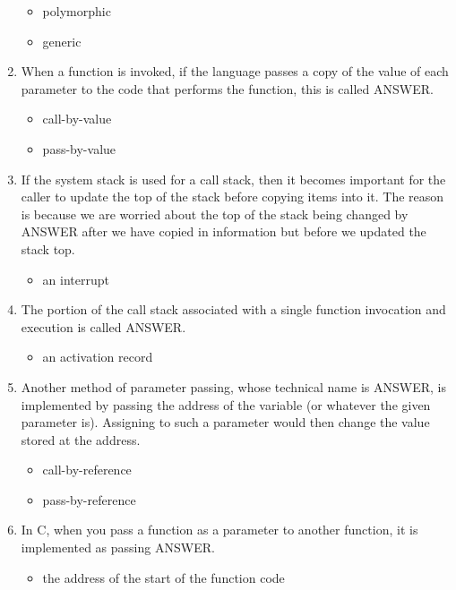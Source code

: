 \documentclass{exam}
\begin{document}
\begin{enumerate}
\begin{itemize}
\item polymorphic
\item generic
\end{itemize}
\item When a function is invoked, if the language passes a copy of the value of each parameter to the code that performs the function, this is called ANSWER.
\begin{itemize}
\item call-by-value
\item pass-by-value
\end{itemize}
\item If the system stack is used for a call stack, then it becomes important for the caller to update the top of the stack before copying items into it.  The reason is because we are worried about the top of the stack being changed by ANSWER after we have copied in information but before we updated the stack top.
\begin{itemize}
\item an interrupt
\end{itemize}
\item The portion of the call stack associated with a single function invocation and execution is called ANSWER.
\begin{itemize}
\item an activation record
\end{itemize}
\item Another method of parameter passing, whose technical name is ANSWER, is implemented by passing the address of the variable (or whatever the given parameter is).  Assigning to such a parameter would then change the value stored at the address.
\begin{itemize}
\item call-by-reference
\item pass-by-reference
\end{itemize}
\item In C, when you pass a function as a parameter to another function, it is implemented as passing ANSWER.
\begin{itemize}
\item the address of the start of the function code
\end{itemize}
\end{enumerate}
\end{document}
